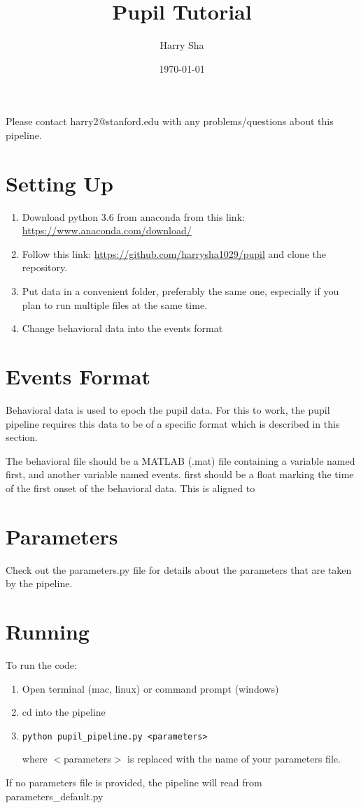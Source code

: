 \documentclass{article}
\title{\textcolor{sectioncolor}{Pupil Tutorial}}
\author{Harry Sha}
\date{\today}
\begin{document}
\clearpage\maketitle
Please contact harry2@stanford.edu with any problems/questions about this pipeline.
\tableofcontents
\thispagestyle{empty}

\sectionfont{\color{sectioncolor}}
\subsectionfont{\color{subsectioncolor}}

\section{Setting Up}
\begin{enumerate}
\item Download python 3.6 from anaconda from this link: \href{https://www.anaconda.com/download/}{https://www.anaconda.com/download/}
\item Follow this link: \href{https://github.com/harrysha1029/pupil}{https://github.com/harrysha1029/pupil} and clone the repository.
\item Put data in a convenient folder, preferably the same one, especially if you plan to run multiple files at the same time.
\item Change behavioral data into the events format
\end{enumerate}

\section{Events Format}
Behavioral data is used to epoch the pupil data. For this to work, the pupil pipeline requires this data to be of a specific format which is described in this section.

The behavioral file should be a MATLAB (.mat) file containing a variable named first, and another variable named events. first should be a float marking the time of the first onset of the behavioral data. This is aligned to



\section{Parameters}
Check out the parameters.py file for details about the parameters that are taken by the pipeline.


\section{Running}
To run the code:
\begin{enumerate}
\item Open terminal (mac, linux) or command prompt (windows)
\item cd into the pipeline
\item \begin{lstlisting}
python pupil_pipeline.py <parameters>
\end{lstlisting}
where $<$parameters$>$ is replaced with the name of your parameters file.
\end{enumerate}If no parameters file is provided, the pipeline will read from parameters\_default.py
\end{document}
